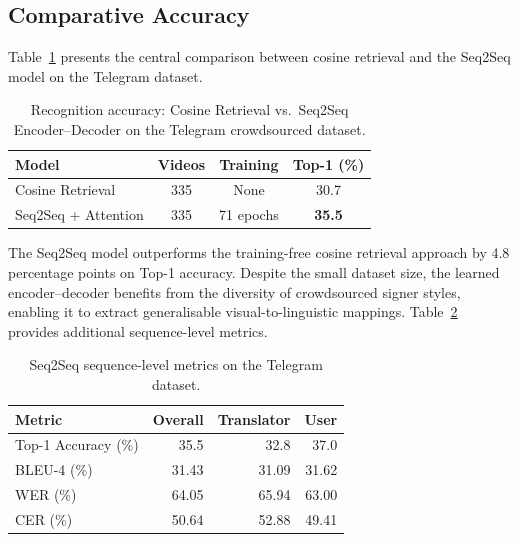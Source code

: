 \documentclass[runningheads]{llncs}
\begin{document}
\subsection{Comparative Accuracy}\label{sec:accuracy}

Table~\ref{tab:comparison} presents the central comparison between
cosine retrieval and the Seq2Seq model on the Telegram dataset.

\begin{table}[t]
\centering
\caption{Recognition accuracy: Cosine Retrieval vs.\ Seq2Seq
Encoder--Decoder on the Telegram crowdsourced dataset.}
\label{tab:comparison}
\begin{tabular}{@{}lccc@{}}
\toprule
Model & Videos & Training & Top-1 (\%) \\
\midrule
Cosine Retrieval      & 335 & None      & 30.7 \\
Seq2Seq + Attention   & 335 & 71 epochs & \textbf{35.5} \\
\bottomrule
\end{tabular}
\end{table}

The Seq2Seq model outperforms the training-free cosine retrieval
approach by 4.8 percentage points on Top-1 accuracy.
Despite the small dataset size, the learned encoder--decoder
benefits from the diversity of crowdsourced signer styles, enabling
it to extract generalisable visual-to-linguistic mappings.
Table~\ref{tab:seq2seq_metrics} provides additional sequence-level
metrics.

\begin{table}[t]
\centering
\caption{Seq2Seq sequence-level metrics on the Telegram dataset.}
\label{tab:seq2seq_metrics}
\begin{tabular}{@{}lrrr@{}}
\toprule
Metric & Overall & Translator & User \\
\midrule
Top-1 Accuracy (\%) & 35.5 & 32.8 & 37.0 \\
BLEU-4 (\%)         & 31.43 & 31.09 & 31.62 \\
WER (\%)            & 64.05 & 65.94 & 63.00 \\
CER (\%)            & 50.64 & 52.88 & 49.41 \\
\bottomrule
\end{tabular}
\end{table}

\end{document}
